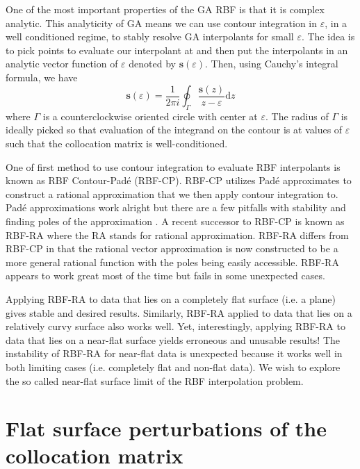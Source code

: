 \documentclass[a4paper,11pt]{article}
\newcommand{\eps}{\varepsilon}
\newcommand{\dd}[1]{\mathrm{d}#1}
\begin{document}
One of the most important properties of the GA RBF is that it is complex analytic. This analyticity of GA means we can use contour integration in $ \eps $, in a well conditioned regime, to stably resolve GA interpolants for small $ \eps $. The idea is to pick points to evaluate our interpolant at and then put the interpolants in an analytic vector function of $ \eps $ denoted by $ \mathbf{s}(\eps) $. Then, using Cauchy's integral formula, we have
\[
	\mathbf{s}(\eps) = \frac{1}{2\pi i} \oint_\Gamma \frac{\mathbf{s}(z)}{z - \eps} \dd z
\] 
where $ \Gamma $ is a counterclockwise oriented circle with center at $ \eps $. The radius of $ \Gamma $ is ideally picked so that evaluation of the integrand on the contour is at values of $ \eps $ such that the collocation matrix is well-conditioned. 

One of first method to use contour integration to evaluate RBF interpolants is known as RBF Contour-Pad\'e (RBF-CP). RBF-CP utilizes Pad\'e approximates to construct a rational approximation that we then apply contour integration to. Pad\'e approximations work alright but there are a few pitfalls with stability and finding poles of the approximation \cite{rbf-ra}. A recent successor to RBF-CP is known as RBF-RA where the RA stands for rational approximation. RBF-RA differs from RBF-CP in that the rational vector approximation is now constructed to be a more general rational function with the poles being easily accessible. RBF-RA appears to work great most of the time but fails in some unexpected cases.

Applying RBF-RA to data that lies on a completely flat surface (i.e. a plane) gives stable and desired results. Similarly, RBF-RA applied to data that lies on a relatively curvy surface also works well. Yet, interestingly, applying RBF-RA to data that lies on a near-flat surface yields erroneous and unusable results! The instability of RBF-RA for near-flat data is unexpected because it works well in both limiting cases (i.e. completely flat and non-flat data). We wish to explore the so called near-flat surface limit of the RBF interpolation problem. 


\section{Flat surface perturbations of the collocation matrix}
\end{document}
